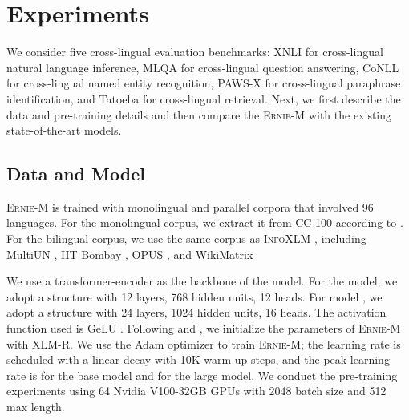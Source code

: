 \documentclass[11pt]{article}
\begin{document}
\section{Experiments}
We consider five cross-lingual evaluation benchmarks: XNLI for cross-lingual natural language inference, MLQA for cross-lingual question answering, CoNLL for cross-lingual named entity recognition, PAWS-X for cross-lingual paraphrase identification, and Tatoeba for cross-lingual retrieval. Next, we first describe the data and pre-training details and then compare the \textsc{Ernie-M} with the existing state-of-the-art models.

\subsection{Data and Model}
\textsc{Ernie-M} is trained with monolingual and parallel corpora that involved 96 languages. For the monolingual corpus, we extract it from CC-100 according to \citet{wenzek2019ccnet, conneau2019unsupervised}. For the bilingual corpus, we use the same corpus as \textsc{InfoXLM} \cite{chi2020infoxlm}, including MultiUN \cite{ziemski2016united}, IIT Bombay \cite{kunchukuttan2017iit}, OPUS \cite{tiedemann2012parallel}, and WikiMatrix \cite{schwenk2019wikimatrix}


We use a transformer-encoder \cite{vaswani2017attention} as the backbone of the model. For the  model, we adopt a structure with 12 layers, 768 hidden units, 12 heads. For  model , we adopt a structure with 24 layers, 1024 hidden units, 16 heads. The activation function used is GeLU \cite{hendrycks2016gaussian}. Following \citealt{chi2020infoxlm} and \citealt{luo2020veco}, we initialize the parameters of \textsc{Ernie-M} with XLM-R. We use the Adam optimizer \cite{kingma2014adam} to train \textsc{Ernie-M}; the learning rate is scheduled with a linear decay with 10K warm-up steps, and the peak learning rate is  for the base model and  for the large model. We conduct the pre-training experiments using 64 Nvidia V100-32GB GPUs with 2048 batch size and 512 max length. 
\end{document}
